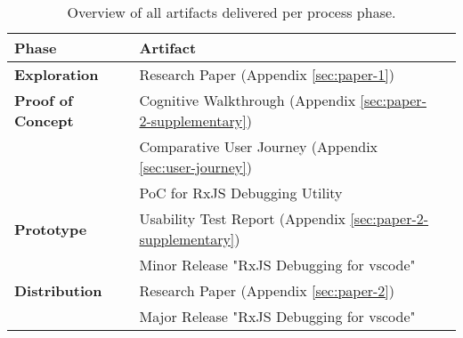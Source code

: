 
\begin{table}[H]
  \centering
  \label{tbl:artifact-overview}
  \caption{Overview of all artifacts delivered per process phase.}

  \newcommand\Tstrut{\rule{0pt}{2.6ex}}       %
  \newcommand\Bstrut{\rule[-0.9ex]{0pt}{0pt}} %
  \newcommand{\TBstrut}{\Tstrut\Bstrut} %

  \begin{tabular}{llp{7.37cm}}
    \small{\textbf{Phase}}                              & \small{\textbf{Artifact}}                                     \TBstrut \\
    \hline
    \small{\textbf{Exploration}}                        & \small{Research Paper (Appendix \ref{sec:paper-1})}                                       \TBstrut \\
    \hline
    \small{\textbf{Proof of Concept}}  & \small{Cognitive Walkthrough (Appendix \ref{sec:paper-2-supplementary})}                                \TBstrut \\
                                               & \small{Comparative User Journey (Appendix \ref{sec:user-journey})}                              \Bstrut  \\
                                               & \small{PoC for RxJS Debugging Utility}                        \Bstrut \\
    \hline
    \small{\textbf{Prototype}}         & \small{Usability Test Report (Appendix \ref{sec:paper-2-supplementary})}                               \TBstrut  \\
                                               & \small{Minor Release "RxJS Debugging for vscode"} \Bstrut \\
    \hline
    \small{\textbf{Distribution}}          & \small{Research Paper (Appendix \ref{sec:paper-2})}                                      \TBstrut  \\
                                               & \small{Major Release "RxJS Debugging for vscode"} \Bstrut \\
    \hline
  \end{tabular}
\end{table}
